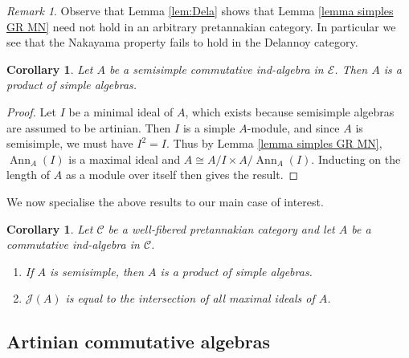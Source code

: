 \documentclass[11pt]{amsart}
\def\Cs{\mathscr{C}}
\def\Es{\mathscr{E}}
\def\cC{\mathscr{C}}
\newtheorem{cor}[thm]{Corollary}
\theoremstyle{definition}
\theoremstyle{remark}
\newtheorem{remark}[thm]{Remark}
\numberwithin{equation}{section}
\begin{document}
\begin{remark}
    Observe that Lemma \ref{lem:Dela} shows that Lemma \ref{lemma simples GR MN} need not hold in an arbitrary pretannakian category.  In particular we see that the Nakayama property fails to hold in the Delannoy category. 
\end{remark}

\begin{cor}\label{cor semisimple prod of simple algs}
    Let $A$ be a semisimple commutative ind-algebra in  $\Es$.  Then $A$ is a product of simple algebras.
\end{cor}

\begin{proof}
   Let $I$ be a minimal ideal of $A$,  which exists because semisimple algebras are assumed to be artinian. Then $I$ is a simple $A$-module, and since $A$ is semisimple, we must have $I^2=I$.  Thus by Lemma \ref{lemma simples GR MN}, $\operatorname{Ann}_A(I)$ is a maximal ideal and $A\cong A/I\times A/\operatorname{Ann}_A(I)$.  Inducting on the length of $A$ as a module over itself then gives the result.     
\end{proof}

We now specialise the above results to our main case of interest.
\begin{cor}\label{cor:NakSS}
    Let $\cC$ be a well-fibered pretannakian category and let $A$ be a commutative ind-algebra in  $\Cs$.
    \begin{enumerate}
        \item If $A$ is semisimple, then $A$ is a product of simple algebras.
        \item $\mathcal{J}(A)$ is equal to the intersection of all maximal ideals of $A$.
    \end{enumerate}
\end{cor}





\medskip

\subsection{Artinian commutative algebras}\label{section artinian comm algs GR MN} 
\end{document}
